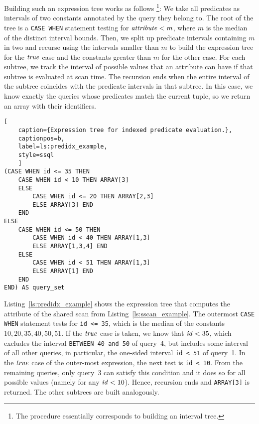 Building such an expression tree works as follows%
\footnote{The procedure essentially corresponds to building an interval tree.}:
We take all predicates as intervals of two constants
annotated by the query they belong to.
The root of the tree is a \lstinline[style=sql]{CASE WHEN} statement
testing for $\varname{attribute} < m$,
where $m$ is the median of the distinct interval bounds.
Then, we split up predicate intervals containing $m$ in two
and recurse using the intervals smaller than $m$
to build the expression tree for the $\varname{true}$ case
and the constants greater than $m$ for the other case.
For each subtree, we track the interval of possible values
that an attribute can have if that subtree is evaluated at scan time.
The recursion ends when the entire interval of the subtree
coincides with the predicate intervals in that subtree.
In this case, we know exactly the queries
whose predicates match the current tuple,
so we return an array with their identifiers.

\begin{lstlisting}[
    caption={Expression tree for indexed predicate evaluation.},
    captionpos=b,
    label=ls:predidx_example,
    style=ssql
    ]
(CASE WHEN id <= 35 THEN
    CASE WHEN id < 10 THEN ARRAY[3]
    ELSE
        CASE WHEN id <= 20 THEN ARRAY[2,3]
        ELSE ARRAY[3] END
    END
ELSE
    CASE WHEN id <= 50 THEN
        CASE WHEN id < 40 THEN ARRAY[1,3]
        ELSE ARRAY[1,3,4] END
    ELSE
        CASE WHEN id < 51 THEN ARRAY[1,3]
        ELSE ARRAY[1] END
    END
END) AS query_set
\end{lstlisting}

Listing~\ref{ls:predidx_example} shows the expression tree
that computes the \qset attribute of the shared scan
from Listing~\ref{ls:sscan_example}.
The outermost \lstinline[style=sql]{CASE WHEN} statement
tests for \lstinline[style=sql]{id <= 35},
which is the median of the constants ${10, 20, 35, 40, 50, 51}$.
If the $\varname{true}$ case is taken, we know that $\varname{id} < 35$,
which excludes the interval
\lstinline[style=sql]{BETWEEN 40 and 50} of query~4,
but includes some interval of all other queries,
in particular, the one-sided interval
\lstinline[style=sql]{id < 51} of query~1.
In the $\varname{true}$ case of the outer-most expression,
the next test is \lstinline[style=sql]{id < 10}.
From the remaining queries, only query~3 can satisfy this condition
and it does so for all possible values (namely for any $\varname{id} < 10$).
Hence, recursion ends and \lstinline[style=sql]{ARRAY[3]} is returned.
The other subtrees are built analogously.

